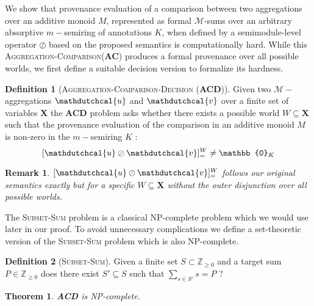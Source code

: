 \documentclass[10pt,a4paper]{scrartcl}
\newtheorem{theorem}{Theorem}[section]
\newtheorem*{remark}{Remark}
\theoremstyle{definition}
\newtheorem{definition}{Definition}[section]
\theoremstyle{remark}
\begin{document}
We show that provenance evaluation of a comparison between 
two aggregations over an additive monoid $M$, 
represented as formal $\mathcal{M}$-sums over an arbitrary 
absorptive $m-$semiring of annotations $K$, when defined by a
semimodule-level operator
$\oslash$ based on the proposed semantics is computationally hard.
While this \textsc{Aggregation-Comparison}(\textbf{AC}) produces 
a formal provenance over all possible worlds, we first define a 
suitable decision version to formalize its hardness. 
\begin{definition}[\textsc{Aggregation-Comparison-Decision} (\textbf{ACD})]
  Given two $\mathcal{M}-$aggregations $\mathdutchcal{u}$ and $\mathdutchcal{v}$ over a 
  finite set of variables $\mathbf{X}$
  the \textbf{ACD} problem asks whether there exists a possible world $W\subseteq\mathbf{X}$ such 
  that the provenance evaluation of the comparison in an additive monoid $M$ is non-zero in 
  the $m-$semiring $K$ :
\[
  [\mathdutchcal{u} \oslash \mathdutchcal{v}]_=^W\neq\mathbb{0}_{K}
  \]
\end{definition}
\begin{remark}
  $  [\mathdutchcal{u} \oslash \mathdutchcal{v}]_=^W$ follows our original semantics exactly but for a specific $W\subseteq\mathbf{X}$ without the outer disjunction over all possible worlds.
\end{remark}
The \textsc{Subset-Sum} problem is a classical NP-complete problem which we would use later in our proof. To avoid unnecessary complications we define a set-theoretic version of the \textsc{Subset-Sum} problem which is also NP-complete. 
\begin{definition}[\textsc{Subset-Sum}]
  Given a finite set $S\subset\mathbb{Z}_{\geq 0}$ and a target sum $P\in\mathbb{Z}_{\geq 0}$ does 
  there exist $S'\subseteq S$ such that $\sum_{s\in S'}s=P$ ?
\end{definition}
\begin{theorem}
  \textbf{ACD} is NP-complete.
\end{theorem}
\end{document}

